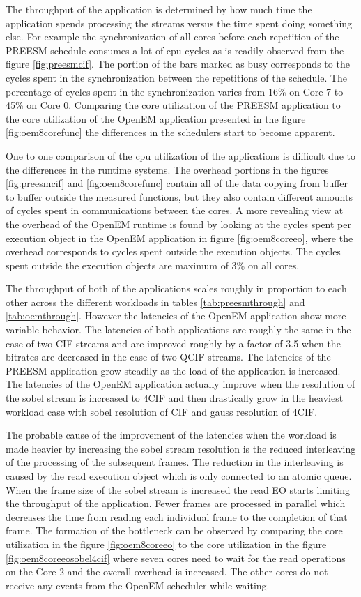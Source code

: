 The throughput of the application is determined by how much time the application
spends processing the streams versus the time spent doing something else. For
example the synchronization of all cores before each repetition of the PREESM
schedule consumes a lot of cpu cycles as is readily observed from the figure
\ref{fig:preesmcif}. The portion of the bars marked as busy corresponds to the
cycles spent in the synchronization between the repetitions of the schedule. The
percentage of cycles spent in the synchronization varies from 16\% on Core 7
to 45\% on Core 0. Comparing the core utilization of the PREESM application to
the core utilization of the OpenEM application presented in the figure
\ref{fig:oem8corefunc} the differences in the schedulers start to become apparent.

One to one comparison of the cpu utilization of the applications is difficult
due to the differences in the runtime systems. The overhead portions in the
figures \ref{fig:preesmcif} and \ref{fig:oem8corefunc} contain all of the data
copying from buffer to buffer outside the measured functions, but they also
contain different amounts of cycles spent in communications between the cores. A
more revealing view at the overhead of the OpenEM runtime is found by looking at
the cycles spent per execution object in the OpenEM application in figure
\ref{fig:oem8coreeo}, where the overhead corresponds to cycles spent outside the
execution objects. The cycles spent outside the execution objects are maximum of
3\% on all cores.

The throughput of both of the applications scales roughly in proportion to each
other across the different workloads in tables \ref{tab:preesmthrough} and
\ref{tab:oemthrough}. However the latencies of the OpenEM application show more
variable behavior. The latencies of both applications are roughly the same in
the case of two CIF streams and are improved roughly by a factor of 3.5 when the
bitrates are decreased in the case of two QCIF streams. The latencies of the
PREESM application grow steadily as the load of the application is increased.
The latencies of the OpenEM application actually improve when the resolution of
the sobel stream is increased to 4CIF and then drastically grow in the heaviest
workload case with sobel resolution of CIF and gauss resolution of 4CIF.

The probable cause of the improvement of the latencies when the workload is made
heavier by increasing the sobel stream resolution is the reduced interleaving of
the processing of the subsequent frames. The reduction in the interleaving is
caused by the read execution object which is only connected to an atomic queue.
When the frame size of the sobel stream is increased the read EO starts limiting
the throughput of the application. Fewer frames are processed in parallel which
decreases the time from reading each individual frame to the completion of that
frame. The formation of the bottleneck can be observed by comparing the core
utilization in the figure \ref{fig:oem8coreeo} to the core utilization in the
figure \ref{fig:oem8coreeosobel4cif} where seven cores need to wait for the read
operations on the Core 2 and the overall overhead is increased. The other cores
do not receive any events from the OpenEM scheduler while waiting.

